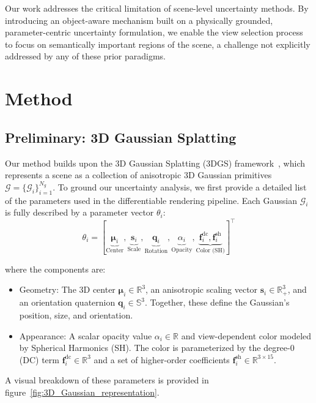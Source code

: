 \documentclass{egpubl}
\begin{document}
Our work addresses the critical limitation of scene-level uncertainty methods. By introducing an object-aware mechanism built on a physically grounded, parameter-centric uncertainty formulation, we enable the view selection process to focus on semantically important regions of the scene, a challenge not explicitly addressed by any of these prior paradigms.

\vspace{-3mm}
\section{Method}
\label{sec:method}

\subsection{Preliminary: 3D Gaussian Splatting}
\label{sec:gaussian-rendering}

Our method builds upon the 3D Gaussian Splatting (3DGS) framework~\cite{kerbl3DGaussianSplatting2023}, which represents a scene as a collection of anisotropic 3D Gaussian primitives $\mathcal{G} = \{ \mathcal{G}_i \}_{i=1}^{N_g}$. To ground our uncertainty analysis, we first provide a detailed list of the parameters used in the differentiable rendering pipeline. Each Gaussian $\mathcal{G}_i$ is fully described by a parameter vector $\theta_i$:
\begin{equation}
\theta_i = \left[
\underbrace{\boldsymbol{\mu}_i}_{\text{Center}},
\underbrace{\mathbf{s}_i}_{\text{Scale}},
\underbrace{\mathbf{q}_i}_{\text{Rotation}},
\underbrace{\alpha_i}_{\text{Opacity}},
\underbrace{\mathbf{f}_i^{\text{dc}}, \mathbf{f}_i^{\text{sh}}}_{\text{Color (SH)}}
\right]^\top \label{eq:gaussian_params}
\end{equation}

\noindent where the components are:
\begin{itemize}
    \item Geometry: The 3D center $\boldsymbol{\mu}_i \in \mathbb{R}^3$, an anisotropic scaling vector $\mathbf{s}_i \in \mathbb{R}^3_+$, and an orientation quaternion $\mathbf{q}_i \in \mathbb{S}^3$. Together, these define the Gaussian's position, size, and orientation.
    \item Appearance: A scalar opacity value $\alpha_i \in \mathbb{R}$ and view-dependent color modeled by Spherical Harmonics (SH). The color is parameterized by the degree-0 (DC) term $\mathbf{f}_i^{\text{dc}} \in \mathbb{R}^3$ and a set of higher-order coefficients $\mathbf{f}_i^{\text{sh}} \in \mathbb{R}^{3 \times 15}$.
\end{itemize}
A visual breakdown of these parameters is provided in figure~\ref{fig:3D_Gaussian_representation}.
\end{document}
